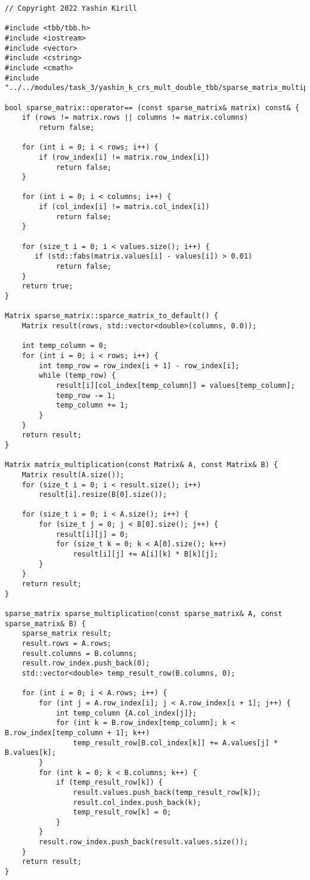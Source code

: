 \documentclass{report}
\begin{document}
\begin{lstlisting}
// Copyright 2022 Yashin Kirill

#include <tbb/tbb.h>
#include <iostream>
#include <vector>
#include <cstring>
#include <cmath>
#include "../../modules/task_3/yashin_k_crs_mult_double_tbb/sparse_matrix_multiplication_tbb.h"

bool sparse_matrix::operator== (const sparse_matrix& matrix) const& {
    if (rows != matrix.rows || columns != matrix.columns)
        return false;

    for (int i = 0; i < rows; i++) {
        if (row_index[i] != matrix.row_index[i])
            return false;
    }

    for (int i = 0; i < columns; i++) {
        if (col_index[i] != matrix.col_index[i])
            return false;
    }

    for (size_t i = 0; i < values.size(); i++) {
       if (std::fabs(matrix.values[i] - values[i]) > 0.01)
            return false;
    }
    return true;
}

Matrix sparse_matrix::sparce_matrix_to_default() {
    Matrix result(rows, std::vector<double>(columns, 0.0));

    int temp_column = 0;
    for (int i = 0; i < rows; i++) {
        int temp_row = row_index[i + 1] - row_index[i];
        while (temp_row) {
            result[i][col_index[temp_column]] = values[temp_column];
            temp_row -= 1;
            temp_column += 1;
        }
    }
    return result;
}

Matrix matrix_multiplication(const Matrix& A, const Matrix& B) {
    Matrix result(A.size());
    for (size_t i = 0; i < result.size(); i++)
        result[i].resize(B[0].size());

    for (size_t i = 0; i < A.size(); i++) {
        for (size_t j = 0; j < B[0].size(); j++) {
            result[i][j] = 0;
            for (size_t k = 0; k < A[0].size(); k++)
                result[i][j] += A[i][k] * B[k][j];
        }
    }
    return result;
}

sparse_matrix sparse_multiplication(const sparse_matrix& A, const sparse_matrix& B) {
    sparse_matrix result;
    result.rows = A.rows;
    result.columns = B.columns;
    result.row_index.push_back(0);
    std::vector<double> temp_result_row(B.columns, 0);

    for (int i = 0; i < A.rows; i++) {
        for (int j = A.row_index[i]; j < A.row_index[i + 1]; j++) {
            int temp_column {A.col_index[j]};
            for (int k = B.row_index[temp_column]; k < B.row_index[temp_column + 1]; k++)
                temp_result_row[B.col_index[k]] += A.values[j] * B.values[k];
        }
        for (int k = 0; k < B.columns; k++) {
            if (temp_result_row[k]) {
                result.values.push_back(temp_result_row[k]);
                result.col_index.push_back(k);
                temp_result_row[k] = 0;
            }
        }
        result.row_index.push_back(result.values.size());
    }
    return result;
}


\end{lstlisting}
\end{document}
